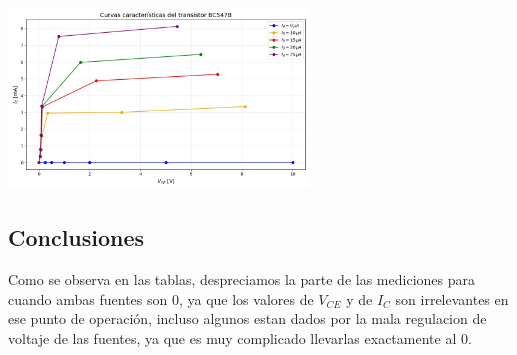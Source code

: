 \includegraphics[width=8cm]{./imagenes/Grafico3.jpg}

\subsection{Conclusiones}

Como se observa en las tablas, despreciamos la parte de las mediciones para cuando ambas fuentes son 0, ya que los valores de $V_{CE}$ y de $I_C$ son irrelevantes en ese punto de operación, incluso algunos estan dados por la mala regulacion de voltaje de las fuentes, ya que es muy complicado llevarlas exactamente al 0.
